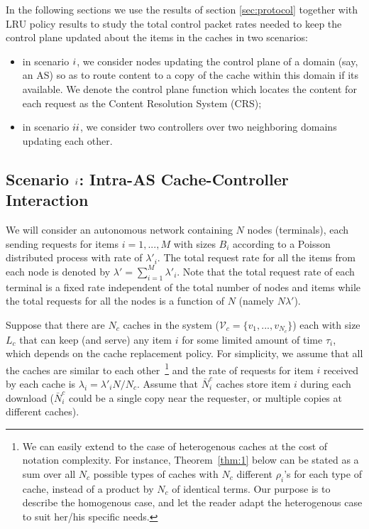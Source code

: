 \documentclass[conference]{IEEEtran}
\theoremstyle{plain}
\theoremstyle{remark}
\begin{document}
In the following sections we use the results of section \ref{sec:protocol} together with LRU policy results to study the total control packet rates needed to keep the control plane updated about the items in the caches in two scenarios: 
\begin{itemize}
\item in scenario $\romannumeral 1$, we consider nodes updating the control plane of a domain (say, an AS) so as to route content to a copy of the cache within this domain if its available. We denote the control plane function which locates the content for each request as the Content Resolution System (CRS);
\item in scenario $\romannumeral 2$, we consider two controllers over two neighboring domains updating each other.
\end{itemize}

\subsection{Scenario $\romannumeral 1$: Intra-AS Cache-Controller Interaction}
\label{subsec:scenario1}

We will consider an autonomous network containing $N$ nodes (terminals), each sending requests for items $i=1,...,M$ with sizes $B_i$ according to a Poisson distributed process with rate of $\lambda'_i$. The total request rate for all the items from each node is denoted by $\lambda'=\sum_{i=1}^{M}\lambda'_i$. Note that the total request rate of each terminal is a fixed rate independent of the total number of nodes and items while the total requests for all the nodes is a function of $N$ (namely $N\lambda'$).

Suppose that there are $N_c$ caches in the system ($\mathcal{V}_c=\{v_1,...,v_{N_c}\}$) each with size $L_c$ that can keep (and serve) any item $i$ for some limited amount of time $\tau_i$, which depends on the cache replacement policy. For simplicity, we assume that all the caches are similar to each other~\footnote{We can easily extend to the case of heterogenous caches at the cost of notation complexity. For instance, Theorem~\ref{thm:1} below can be stated as a sum over all $N_c$ possible types of caches with $N_c$ different $\rho_i$'s for each type of cache, instead of a product by $N_c$ of identical terms. Our purpose is to describe the homogenous case, and let the reader adapt the heterogenous case to suit her/his specific needs.} and the rate of requests for item $i$ received by each cache is $\lambda_i=\lambda'_iN/N_c$. Assume that $\bar{N}^c_i$ caches store item $i$ during each download ($\bar{N}^c_i$ could be a single copy near the requester, or multiple copies at different caches).
\end{document}
